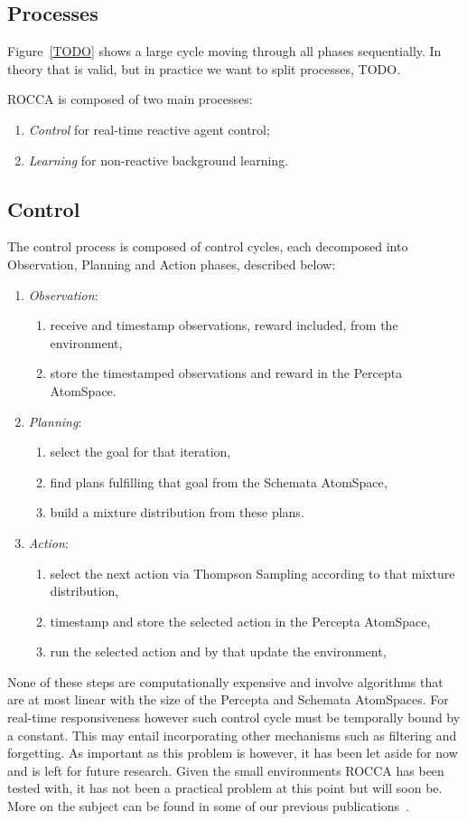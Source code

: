 \documentclass[runningheads]{llncs}
\begin{document}
\subsection{Processes}

Figure~\ref{TODO} shows a large cycle moving through all phases
sequentially.  In theory that is valid, but in practice we want to
split processes, TODO.

ROCCA is composed of two main processes:
\begin{enumerate}
\item \emph{Control} for real-time reactive agent control;
\item \emph{Learning} for non-reactive background learning.
\end{enumerate}

\subsection{Control}
The control process is composed of control cycles, each decomposed
into Observation, Planning and Action phases, described below:
\begin{enumerate}
\item \emph{Observation}:
  \begin{enumerate}
  \item receive and timestamp observations, reward included, from the
    environment,
  \item store the timestamped observations and reward in the Percepta
    AtomSpace.
  \end{enumerate}
\item \emph{Planning}:
  \begin{enumerate}
  \item select the goal for that iteration,
  \item find plans fulfilling that goal from the Schemata AtomSpace,
  \item build a mixture distribution from these plans.
  \end{enumerate}
\item \emph{Action}:
  \begin{enumerate}
  \item select the next action via Thompson Sampling according to that
    mixture distribution,
  \item timestamp and store the selected action in the Percepta
    AtomSpace,
  \item run the selected action and by that update the environment,
  \end{enumerate}
\end{enumerate}
None of these steps are computationally expensive and involve
algorithms that are at most linear with the size of the Percepta and
Schemata AtomSpaces.  For real-time responsiveness however such
control cycle must be temporally bound by a constant.  This may entail
incorporating other mechanisms such as filtering and forgetting.  As
important as this problem is however, it has been let aside for now
and is left for future research.  Given the small environments ROCCA
has been tested with, it has not been a practical problem at this
point but will soon be.  More on the subject can be found in some of
our previous publications~\cite{TODO: EAI}.
\end{document}
